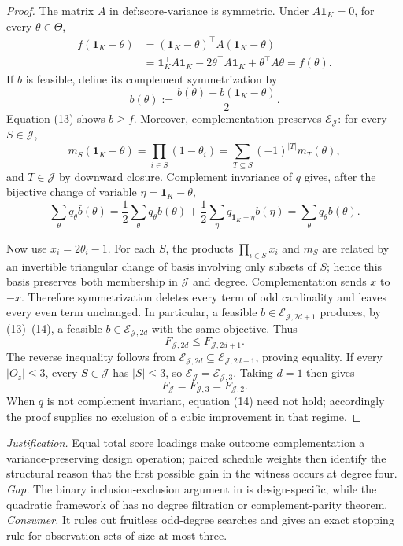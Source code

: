 \documentclass{article}
\begin{document}
\begin{proof}
The matrix \(A\) in \(\text{def:score-variance}\) is symmetric.  Under \(A\mathbf 1_K=0\), for every \(\theta\in\Theta\),
\[
 \begin{aligned}
 f(\mathbf 1_K-\theta)
 &=(\mathbf 1_K-\theta)^\top A(\mathbf 1_K-\theta)\\
 &=\mathbf 1_K^\top A\mathbf 1_K
   -2\theta^\top A\mathbf 1_K+\theta^\top A\theta
 =f(\theta).
 \end{aligned}\tag{13}
\]
If \(b\) is feasible, define its complement symmetrization by
\[
 \bar b(\theta):=\frac{b(\theta)+b(\mathbf 1_K-\theta)}2.
\]
Equation (13) shows \(\bar b\ge f\).  Moreover, complementation preserves \(\mathcal E_{\mathcal J}\): for every \(S\in\mathcal J\),
\[
 m_S(\mathbf 1_K-\theta)=\prod_{i\in S}(1-\theta_i)
 =\sum_{T\subseteq S}(-1)^{|T|}m_T(\theta),
\]
and \(T\in\mathcal J\) by downward closure.  Complement invariance of \(q\) gives, after the bijective change of variable \(\eta=\mathbf 1_K-\theta\),
\[
 \sum_\theta q_\theta\bar b(\theta)
 =\frac12\sum_\theta q_\theta b(\theta)
  +\frac12\sum_\eta q_{\mathbf 1_K-\eta}b(\eta)
 =\sum_\theta q_\theta b(\theta). \tag{14}
\]

Now use \(x_i=2\theta_i-1\).  For each \(S\), the products
\(\prod_{i\in S}x_i\) and \(m_S\) are related by an invertible triangular change of basis involving only subsets of \(S\); hence this basis preserves both membership in \(\mathcal J\) and degree.  Complementation sends \(x\) to \(-x\).  Therefore symmetrization deletes every term of odd cardinality and leaves every even term unchanged.  In particular, a feasible \(b\in\mathcal E_{\mathcal J,2d+1}\) produces, by (13)--(14), a feasible \(\bar b\in\mathcal E_{\mathcal J,2d}\) with the same objective.  Thus
\[
 F_{\mathcal J,2d}\le F_{\mathcal J,2d+1}.
\]
The reverse inequality follows from \(\mathcal E_{\mathcal J,2d}\subseteq\mathcal E_{\mathcal J,2d+1}\), proving equality.  If every \(|O_z|\le3\), every \(S\in\mathcal J\) has \(|S|\le3\), so \(\mathcal E_{\mathcal J}=\mathcal E_{\mathcal J,3}\).  Taking \(d=1\) then gives
\[
 F_{\mathcal J}=F_{\mathcal J,3}=F_{\mathcal J,2}.
\]
When \(q\) is not complement invariant, equation (14) need not hold; accordingly the proof supplies no exclusion of a cubic improvement in that regime.
\end{proof}
\par\smallskip\noindent \textit{Justification.} Equal total score loadings make outcome complementation a variance-preserving design operation; paired schedule weights then identify the structural reason that the first possible gain in the witness occurs at degree four. \textit{Gap.} The binary inclusion-exclusion argument in \cite{Lu2019FactorialBinary} is design-specific, while the quadratic framework of \cite{HarshawMiddletonSavje2026} has no degree filtration or complement-parity theorem. \textit{Consumer.} It rules out fruitless odd-degree searches and gives an exact stopping rule for observation sets of size at most three.
\end{document}
